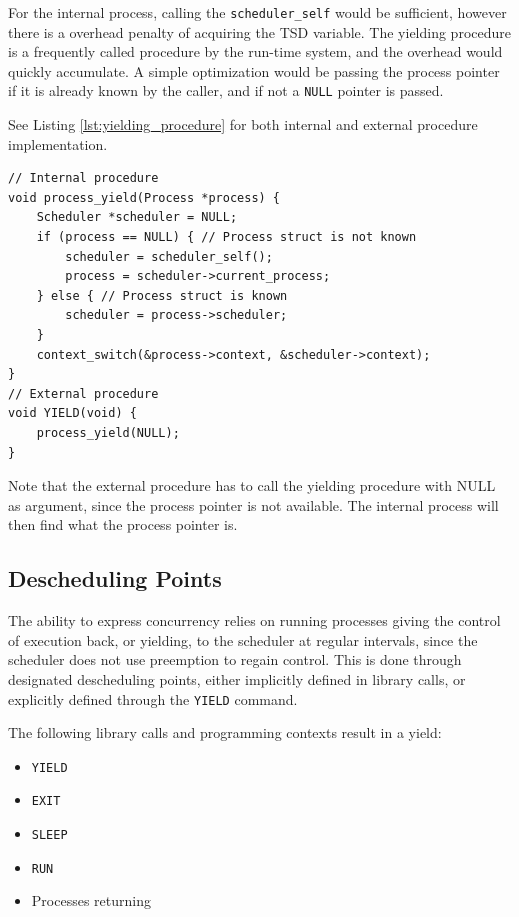 For the internal process, calling the \texttt{scheduler\_self} would be sufficient, however there is a overhead penalty of acquiring the TSD variable. The yielding procedure is a frequently called procedure by the run\hyp{}time system, and the overhead would quickly accumulate. A simple optimization would be passing the process pointer if it is already known by the caller, and if not a \texttt{NULL} pointer is passed.

See Listing \ref{lst:yielding_procedure} for both internal and external procedure implementation.

\noindent\begin{minipage}{\textwidth}
\begin{lstlisting}[style={CustomC},caption={Internal and external yielding procedure},label={lst:yielding_procedure}]
// Internal procedure
void process_yield(Process *process) {
    Scheduler *scheduler = NULL;
    if (process == NULL) { // Process struct is not known
        scheduler = scheduler_self();
        process = scheduler->current_process;
    } else { // Process struct is known
        scheduler = process->scheduler;
    }
    context_switch(&process->context, &scheduler->context);
}
// External procedure
void YIELD(void) {
    process_yield(NULL);
}
\end{lstlisting}
\end{minipage}

Note that the external procedure has to call the yielding procedure with NULL as argument, since the process pointer is not available. The internal process will then find what the process pointer is.


\subsection{Descheduling Points}
\label{subsec:descheduling_points}

The ability to express concurrency relies on running processes giving the control of execution back, or yielding, to the scheduler at regular intervals, since the scheduler does not use preemption to regain control. This is done through designated descheduling points, either implicitly defined in library calls, or explicitly defined through the \texttt{YIELD} command.

The following library calls and programming contexts \underline{} result in a yield:

\begin{multicols}{2}
\begin{itemize}[topsep=0em,itemsep=-1em,partopsep=0.5em,parsep=1em]
    \item \texttt{YIELD}
    \item \texttt{EXIT}
    \item \texttt{SLEEP}
    \item \texttt{RUN}
    \item Processes returning
\end{itemize}
\end{multicols}

